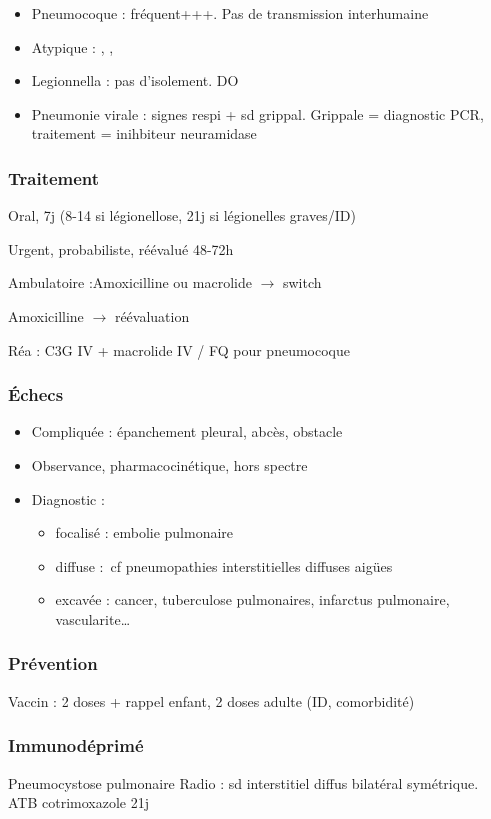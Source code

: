 \documentclass{article}
\newcommand*{\TakeFourierOrnament}[1]{{%
\fontencoding{U}\fontfamily{futs}\selectfont\char#1}}
\newcommand*{\danger}{\TakeFourierOrnament{66}}
\begin{document}
\begin{itemize}
  \item Pneumocoque : fréquent+++. Pas de transmission interhumaine
  \item Atypique : , , 
  \item Legionnella : pas d'isolement. DO
  \item Pneumonie virale : signes respi + sd grippal. Grippale = diagnostic PCR, traitement = inihbiteur neuramidase \danger {}
\end{itemize}
\subsubsection{Traitement}
Oral, 7j (8-14 si légionellose, 21j si légionelles graves/ID)

Urgent, probabiliste, réévalué 48-72h

Ambulatoire :Amoxicilline ou macrolide \(\to\) switch

\faHospitalSign  Amoxicilline \(\to\) réévaluation

Réa : C3G IV + macrolide IV / FQ pour pneumocoque

\subsubsection{Échecs}
\begin{itemize}
  \item Compliquée : épanchement pleural, abcès, obstacle
  \item Observance, pharmacocinétique, hors spectre
  \item Diagnostic :
    \begin{itemize}
      \item focalisé : embolie pulmonaire
      \item diffuse : cf pneumopathies interstitielles diffuses aigües
      \item excavée : cancer, tuberculose pulmonaires, infarctus pulmonaire, vascularite\ldots{}
    \end{itemize}
\end{itemize}

\subsubsection{Prévention}
Vaccin : 2 doses + rappel enfant, 2 doses adulte (ID, comorbidité)

\subsubsection{Immunodéprimé}
Pneumocystose pulmonaire
Radio : sd interstitiel diffus bilatéral symétrique. ATB cotrimoxazole 21j
\end{document}
